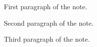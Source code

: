 \documentclass[12pt]{article}
\begin{document}
First paragraph of the note.

Second paragraph of the note.

Third paragraph of the note.
\end{document}
